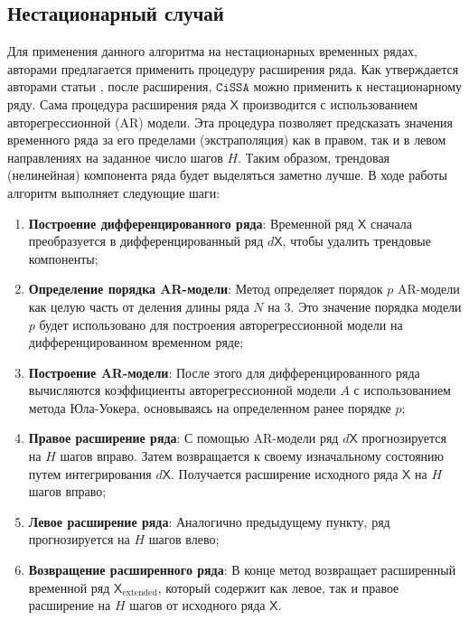 \documentclass[12pt, specialist, subf
]{disser}
\theoremstyle{definition}
\newcommand{\CISSA}{\texttt{CiSSA}}
\newcommand{\TS}{\mathsf{X}}
\begin{document}
\subsection*{Нестационарный случай}
Для применения данного алгоритма на нестационарных временных рядах, авторами предлагается применить процедуру расширения ряда. Как утверждается авторами статьи \cite{bogalo2020}, после расширения, $\CISSA$ можно применить к нестационарному ряду.
Сама процедура расширения ряда $\TS$ производится с использованием авторегрессионной (AR) модели. Эта процедура позволяет предсказать значения временного ряда за его пределами (экстраполяция) как в правом, так и в левом направлениях на заданное число шагов $H$. Таким образом, трендовая (нелинейная) компонента ряда будет выделяться заметно лучше. В ходе работы алгоритм выполняет следующие шаги:
\begin{enumerate}
	\item \textbf{Построение дифференцированного ряда}:
	      Временной ряд $\TS$ сначала преобразуется в дифференцированный ряд $d \TS$, чтобы удалить трендовые компоненты;

	\item \textbf{Определение порядка AR-модели}:
	      Метод определяет порядок $p$ AR-модели как целую часть от деления длины ряда $N$ на 3. Это значение порядка модели $p$ будет использовано для построения авторегрессионной модели на дифференцированном временном ряде;


	\item \textbf{Построение AR-модели}:
	      После этого для дифференцированного ряда вычисляются коэффициенты авторегрессионной модели $A$ с использованием метода Юла-Уокера, основываясь на определенном ранее порядке $p$;

	\item \textbf{Правое расширение ряда}:
	      С помощью AR-модели ряд $d\TS$ прогнозируется на $H$ шагов вправо. Затем возвращается к своему изначальному состоянию путем интегрирования $d\TS$. Получается расширение исходного ряда $\TS$ на $H$ шагов вправо;

	\item \textbf{Левое расширение ряда}:
	      Аналогично предыдущему пункту, ряд прогнозируется на $H$ шагов влево;

	\item \textbf{Возвращение расширенного ряда}:
	      В конце метод возвращает расширенный временной ряд $\TS_{\mathrm{extended}}$, который содержит как левое, так и правое расширение на $H$ шагов от исходного ряда $\TS$.
\end{enumerate}
\end{document}
